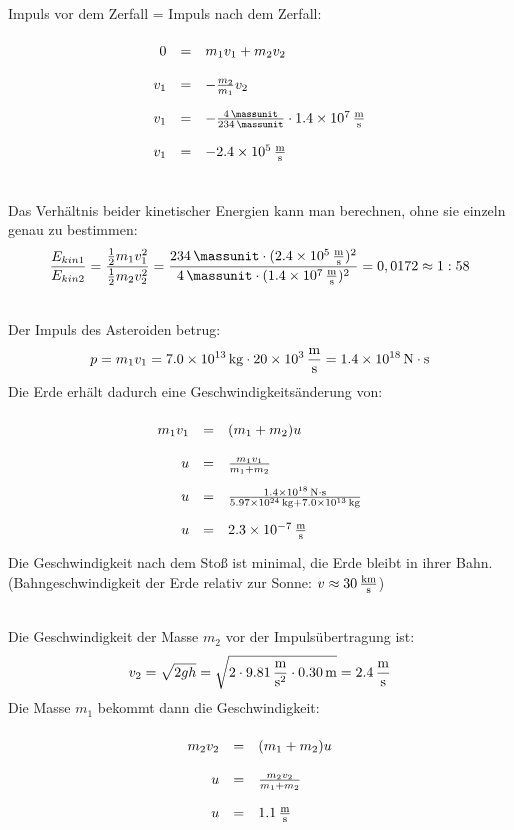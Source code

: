 \documentclass[a4paper]{article}
\begin{document}
\\
Impuls vor dem Zerfall = Impuls nach dem Zerfall:
$$
\renewcommand{\arraystretch}{2}
\begin{array}{rcll}
 0 &=& m_1v_1 + m_2v_2 \\
 v_1 &=& - {m_2 \over m_1}v_2 \\
 v_1 &=& -{\SI{4}{\massunit} \over \SI{234}{\massunit}} \cdot\SI{1,4e7}{\meter\over \second}\\
 v_1 &=& \SI{-2,4e5}{\meter\over \second}
\end{array}
$$
\vspace{0.5 cm}

\\
Das Verhältnis beider kinetischer Energien kann man berechnen, ohne sie einzeln genau zu bestimmen:
$$
{E_{kin1}\over E_{kin2}}= {{1 \over 2}m_1v_1^2 \over {1 \over 2} m_2v_2^2} = { \SI{234}{\massunit} \cdot (\SI{2,4e5}{\meter\over \second})^2 \over \SI{4}{\massunit}\cdot (\SI{1,4e7}{\meter\over\second})^2}=0,0172 \approx 1 : 58$$
\vspace{0.5 cm}

\\
Der Impuls des Asteroiden betrug:
$$p=m_1v_1=\SI{7,0e13}{\kilogram} \cdot \SI{20e3}{\meter\over \second} = \SI{1,4e18}{\newton\cdot\second}$$
Die Erde erhält dadurch eine Geschwindigkeitsänderung von:
$$
\renewcommand{\arraystretch}{2}
\begin{array}{rcll}
 m_1v_1 &=& (m_1+m_2)u \\
 u &=& {m_1v_1 \over m_1+m_2}\\
 u &=& {\SI{1,4e18}{\newton\cdot\second}\over\SI{5,97e24}{\kilogram} +\SI{7,0e13}{\kilogram}}\\
 u &=& \SI{2,3e-7}{\meter\over \second}
\end{array}
$$ 
Die Geschwindigkeit nach dem Stoß ist minimal, die Erde bleibt in ihrer Bahn.
(Bahngeschwindigkeit der Erde relativ zur Sonne: $v \approx \SI{30}{\kilo\meter\over \second}$)
\vspace{0.5 cm}

\\
Die Geschwindigkeit der Masse $m_2$ vor der Impulsübertragung ist:
$$v_2 = \sqrt{2gh} = \sqrt{2\cdot \SI{9,81}{\meter \over {\second^2}} \cdot \SI{0,30}{\meter}}=\SI{2,4}{\meter\over \second}$$
Die Masse $m_1$ bekommt dann die Geschwindigkeit:
$$
\renewcommand{\arraystretch}{2}
\begin{array}{rcll}
 m_2v_2 &=& (m_1+m_2)u \\
  u &=& {m_2v_2 \over m_1 + m_2} \\
  u &=& \SI{1,1}{\meter\over\second}
\end{array}
$$
\vspace{0.5 cm}
\end{document}
